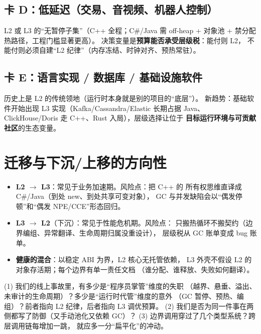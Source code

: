 \documentclass[12pt,a4paper,fontset=fandol]{ctexbook}
\begin{document}
\subsection*{卡 D：低延迟（交易、音视频、机器人控制）}

L2 或 L3 的``无暂停子集''（C++ 全程；C\#/Java 需
off-heap + 对象池 + 禁分配热路径，工程门槛显著更高）。
决策变量是\textbf{预算能否承受层级税}：能付则 L2，
不能付则必须自建``L2 纪律''（内存冻结、时钟对齐、预热常驻）。

\subsection*{卡 E：语言实现 / 数据库 / 基础设施软件}

历史上是 L2 的传统领地（运行时本身就是别的项目的``底层''）。
新趋势：基础软件开始出现 L3 实现（Kafka/Cassandra/Elastic 长期占据 Java、
ClickHouse/Doris 走 C++、Rust 入局），层级选择让位于
\textbf{目标运行环境与可贡献社区}的生态变量。

\section{迁移与下沉/上移的方向性}

\begin{itemize}
  \item \textbf{L2 $\to$ L3}：常见于业务加速期。风险点：把 C++ 的
        所有权思维直译成 C\#/Java（到处 new、到处共享可变对象），
        GC 与并发缺陷会以``偶发停顿''和``偶发 NPE/CCE''形态回归。
  \item \textbf{L3 $\to$ L2}（下沉）：常见于性能危机期。风险点：
        只搬热循环不搬契约（边界编组、异常翻译、生命周期归属没重设计），
        层级税从 GC 账单变成 bug 账单。
  \item \textbf{健康的混合}：以稳定 ABI 为界，L2 核心无托管依赖，
        L3 外壳不假设 L2 的对象存活期；每个边界有单一责任文档
        （谁分配、谁释放、失败如何翻译）。
\end{itemize}

\begin{bestpractice}[title=层级自检三问（季度回顾可直接用）]
(1) 我们的线上事故里，有多少是``程序员掌管''维度的失职
（越界、悬垂、溢出、未审计的生命周期）？多少是``运行时代管''维度的意外
（GC 暂停、预热、编组）？前者指向 L2 纪律，后者指向 L3 调优预算。
(2) 我们是否为同一件事在两侧都写了防御（又手动池化又依赖 GC）？
(3) 边界调用穿过了几个类型系统？跨层调用链每增加一跳，
    就应多一分``扁平化''的冲动。
\end{bestpractice}
\end{document}
